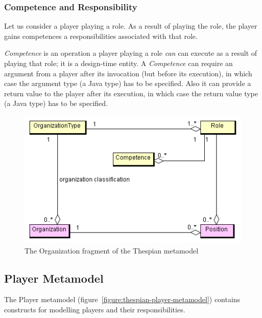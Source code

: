\subsubsection*{Competence and Responsibility}

Let us consider a player playing a role.
As a result of playing the role, the player gains competences a responsibilities associated with that role.

\textit{Competence} is an operation a player playing a role \textit{can} can execute as a result of playing that role; it is a design-time entity.
A \textit{Competence} can require an argument from a player after its invocation (but before its execution), in which case the argument type (a Java type) has to be specified.
Also it can provide a return value to the player after its execution, in which case the return value type (a Java type) has to be specified.

\begin{figure}[ht]
	\centering
	\includegraphics[width=\textwidth]{images/thespian/organization-metamodel.png}
	\caption{The Organization fragment of the Thespian metamodel}
	\label{figure:thespian-organization-metamodel}
\end{figure}

\subsection{Player Metamodel}

The Player metamodel (figure~\ref{figure:thespian-player-metamodel}) contains constructs for modelling players and their responsibilities.

